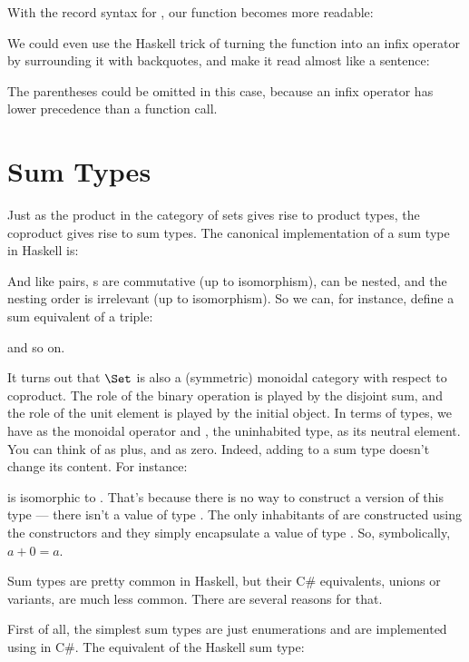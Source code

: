 With the record syntax for , our function
 becomes more readable:

We could even use the Haskell trick of turning the function
 into an infix operator by surrounding it with
backquotes, and make it read almost like a sentence:

The parentheses could be omitted in this case, because an infix operator
has lower precedence than a function call.

\section{Sum Types}

Just as the product in the category of sets gives rise to product types,
the coproduct gives rise to sum types. The canonical implementation of a
sum type in Haskell is:

And like pairs, s are commutative (up to isomorphism),
can be nested, and the nesting order is irrelevant (up to isomorphism).
So we can, for instance, define a sum equivalent of a triple:

and so on.

It turns out that $\Set$ is also a (symmetric) monoidal category
with respect to coproduct. The role of the binary operation is played by
the disjoint sum, and the role of the unit element is played by the
initial object. In terms of types, we have  as the
monoidal operator and , the uninhabited type, as its
neutral element. You can think of  as plus, and
 as zero. Indeed, adding  to a sum type
doesn't change its content. For instance:

is isomorphic to . That's because there is no way to construct
a  version of this type --- there isn't a value of type
. The only inhabitants of  are
constructed using the  constructors and they simply
encapsulate a value of type . So, symbolically, $a + 0 = a$.

Sum types are pretty common in Haskell, but their C\# equivalents,
unions or variants, are much less common. There are several reasons for
that.

First of all, the simplest sum types are just enumerations and are
implemented using  in C\#. The equivalent of the Haskell
sum type:

